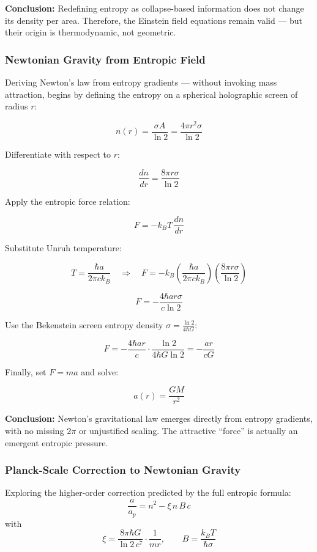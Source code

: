 \documentclass[12pt]{article}
\begin{document}
\noindent
\textbf{Conclusion:} Redefining entropy as collapse-based information does not change its density per area. Therefore, the Einstein field equations remain valid — but their origin is thermodynamic, not geometric.

\subsubsection*{Newtonian Gravity from Entropic Field}

Deriving Newton’s law from entropy gradients — without invoking mass attraction, begins by defining the entropy on a spherical holographic screen of radius $r$:

\[
n(r) = \frac{\sigma A}{\ln 2} = \frac{4\pi r^2 \sigma}{\ln 2}
\]

Differentiate with respect to $r$:

\[
\frac{dn}{dr} = \frac{8\pi r \sigma}{\ln 2}
\]

Apply the entropic force relation:

\[
F = -k_{\!B} T \, \frac{dn}{dr}
\]

Substitute Unruh temperature:

\[
T = \frac{\hbar a}{2\pi c k_{\!B}} \quad \Rightarrow \quad
F = -k_{\!B} \left( \frac{\hbar a}{2\pi c k_{\!B}} \right) \left( \frac{8\pi r \sigma}{\ln 2} \right)
\]

\[
F = - \frac{4 \hbar a r \sigma}{c \ln 2}
\]

Use the Bekenstein screen entropy density \( \sigma = \frac{\ln 2}{4 \hbar G} \):

\[
F = - \frac{4 \hbar a r}{c} \cdot \frac{\ln 2}{4 \hbar G \ln 2} = - \frac{a r}{c G}
\]

Finally, set \( F = m a \) and solve:

\[
a(r) = \frac{G M}{r^2}
\]

\noindent
\textbf{Conclusion:} Newton’s gravitational law emerges directly from entropy gradients, with no missing $2\pi$ or unjustified scaling. The attractive “force” is actually an emergent entropic pressure.

\subsubsection*{Planck-Scale Correction to Newtonian Gravity}

Exploring the higher-order correction predicted by the full entropic formula:
\[
\frac{a}{a_p} = n^2 - \xi\, n\, B\, c
\]
with
\[
\xi = \frac{8 \pi \hbar G}{\ln 2\, c^7} \cdot \frac{1}{m r}, \qquad
B = \frac{k_{\!B} T}{\hbar \sigma}
\]
\end{document}
